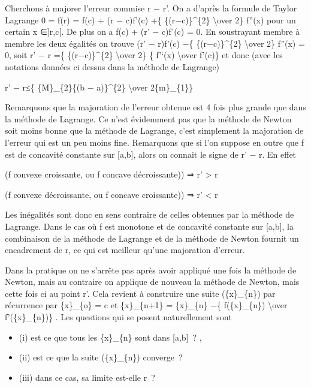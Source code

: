 \documentclass[]{article}
\begin{document}
Cherchons à majorer l'erreur commise \textbar{}r − r'\textbar{}. On a
d'après la formule de Taylor Lagrange 0 = f(r) = f(c) + (r − c)f'(c) +\{
\{(r−c)\}\^{}\{2\} \textbackslash{}over 2\} f''(x) pour un certain x
∈{]}r,c{[}. De plus on a f(c) + (r' − c)f'(c) = 0. En soustrayant membre
à membre les deux égalités on trouve (r' − r)f'(c) −\{
\{(r−c)\}\^{}\{2\} \textbackslash{}over 2\} f''(x) = 0, soit r' − r =\{
\{(r−c)\}\^{}\{2\} \textbackslash{}over 2\} \{ f'`(x)
\textbackslash{}over f'(c)\} et donc (avec les notations données ci
dessus dans la méthode de Lagrange)

\textbar{}r' − r\textbar{}≤\{ \{M\}\_\{2\}\{(b − a)\}\^{}\{2\}
\textbackslash{}over 2\{m\}\_\{1\}\}

Remarquons que la majoration de l'erreur obtenue est 4 fois plus grande
que dans la méthode de Lagrange. Ce n'est évidemment pas que la méthode
de Newton soit moins bonne que la méthode de Lagrange, c'est simplement
la majoration de l'erreur qui est un peu moins fine. Remarquons que si
l'on suppose en outre que f est de concavité constante sur {[}a,b{]},
alors on connait le signe de r' − r. En effet

(f convexe croissante, ou f concave décroissante)) ⇒ r' \textgreater{} r

(f convexe décroissante, ou f concave croissante)) ⇒ r' \textless{} r

Les inégalités sont donc en sens contraire de celles obtenues par la
méthode de Lagrange. Dans le cas où f est monotone et de concavité
constante sur {[}a,b{]}, la combinaison de la méthode de Lagrange et de
la méthode de Newton fournit un encadrement de r, ce qui est meilleur
qu'une majoration d'erreur.

Dans la pratique on ne s'arrête pas après avoir appliqué une fois la
méthode de Newton, mais au contraire on applique de nouveau la méthode
de Newton, mais cette fois ci au point r'. Cela revient à construire une
suite (\{x\}\_\{n\}) par récurrence par \{x\}\_\{o\} = c et
\{x\}\_\{n+1\} = \{x\}\_\{n\} −\{ f(\{x\}\_\{n\}) \textbackslash{}over
f'(\{x\}\_\{n\})\} . Les questions qui se posent naturellement sont

\begin{itemize}
\itemsep1pt\parskip0pt
\item
  (i) est ce que tous les \{x\}\_\{n\} sont dans {[}a,b{]}~? ,
\item
  (ii) est ce que la suite (\{x\}\_\{n\}) converge~?
\item
  (iii) dans ce cas, sa limite est-elle r~?
\end{itemize}
\end{document}
